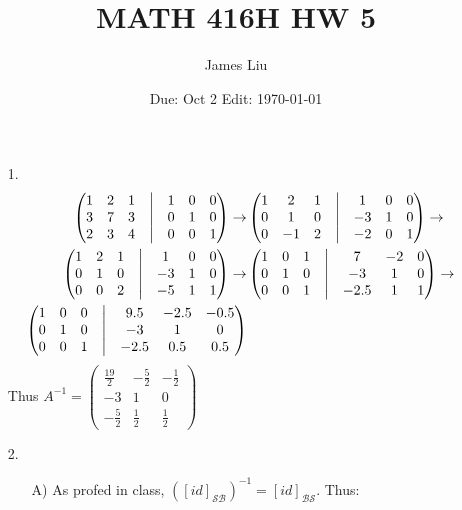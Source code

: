 \documentclass{article}
\date{Due: Oct 2 Edit: \today}
\title{MATH 416H HW 5}
\author{James Liu}
\begin{document}
\maketitle
\begin{itemize}
    \item [1.]
    \begin{align*}
        \begin{pmatrix}
            1&2&1&\bigm|&1&0&0\\
            3&7&3&\bigm|&0&1&0\\
            2&3&4&\bigm|&0&0&1
        \end{pmatrix}\rightarrow&
        \begin{pmatrix}
            1&2&1&\bigm|&1&0&0\\
            0&1&0&\bigm|&-3&1&0\\
            0&-1&2&\bigm|&-2&0&1
        \end{pmatrix}\rightarrow&
        \\
        \begin{pmatrix}
            1&2&1&\bigm|&1&0&0\\
            0&1&0&\bigm|&-3&1&0\\
            0&0&2&\bigm|&-5&1&1
        \end{pmatrix}\rightarrow&
        \begin{pmatrix}
            1&0&1&\bigm|&7&-2&0\\
            0&1&0&\bigm|&-3&1&0\\
            0&0&1&\bigm|&-2.5&1&1
        \end{pmatrix}\rightarrow&
        \\
        \begin{pmatrix}
            1&0&0&\bigm|&9.5&-2.5&-0.5\\
            0&1&0&\bigm|&-3&1&0\\
            0&0&1&\bigm|&-2.5&0.5&0.5
        \end{pmatrix}
    \end{align*}    
    Thus \(A^{-1} = \begin{pmatrix}
        \frac{19}{2}&-\frac{5}{2}&-\frac{1}{2}\\
        -3&1&0\\
        -\frac{5}{2}&\frac{1}{2}&\frac{1}{2}
    \end{pmatrix}\)
    \item [2.]
    \begin{itemize}
        \item [A)] As profed in class, \(\left([id]_{\mathcal{S} \mathcal{B} }\right)^{-1} = [id]_{\mathcal{B} \mathcal{S}}\). Thus:

\end{itemize}
\end{itemize}
\end{document}
